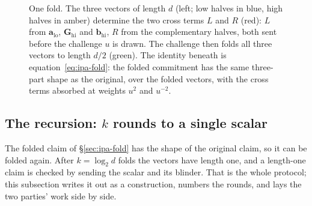 \documentclass[11pt,a4paper]{article}
\theoremstyle{definition}
\newcommand{\ip}[2]{\langle #1,\, #2 \rangle}
\begin{document}
\begin{figure}[htbp]
\caption{One fold. The three vectors of length $d$ (left; low halves in
blue, high halves in amber) determine the two cross terms $L$ and $R$
(red): $L$ from $\mathbf a_{\mathrm{lo}}$, $\mathbf G_{\mathrm{hi}}$ and
$\mathbf b_{\mathrm{hi}}$, $R$ from the complementary halves, both sent
before the challenge $u$ is drawn. The
challenge then folds all three vectors to length $d/2$ (green). The
identity beneath is equation~\eqref{eq:ipa-fold}: the folded commitment
has the same three-part shape as the original, over the folded vectors,
with the cross terms absorbed at weights $u^2$ and $u^{-2}$.}
\label{fig:ipa-fold}
\end{figure}

\subsection{The recursion: \texorpdfstring{$k$}{k} rounds to a single
  scalar}
\label{sec:ipa-recursion}

The folded claim of \S\ref{sec:ipa-fold} has the shape of the original
claim, so it can be folded again. After $k = \log_2 d$ folds the vectors have
length one, and a length-one claim is checked by sending the scalar and its
blinder. That is the whole protocol; this subsection writes it out as a
construction, numbers the rounds, and lays the two parties' work side by side.
\end{document}
